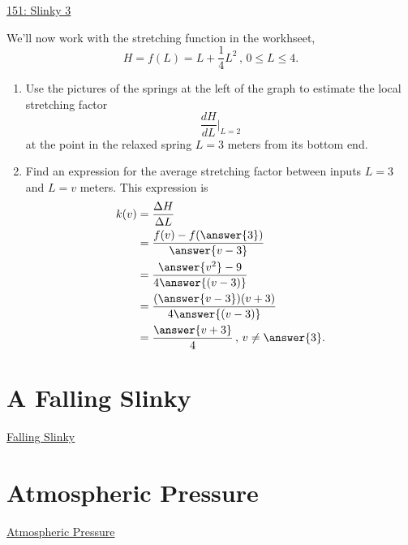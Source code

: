 \documentclass{ximera}
\begin{document}
\begin{example}
\begin{onlineOnly}
    \begin{center}
\end{center}
\end{onlineOnly}

\href{https://www.desmos.com/calculator/euapqewpoo}{151: Slinky 3}

We'll now work with the stretching function in the workhseet,
\[
      H = f(L) = L + \frac{1}{4}L^2 \, , \, 0\leq L \leq 4.
\]

\begin{enumerate}
\item Use the pictures of the springs at the left of the graph to estimate the local stretching factor
\[
  \frac{dH}{dL}\Big|_{L=2}
\]
at the point in the relaxed spring $L=3$ meters from its bottom end.

\item Find an expression for the average stretching factor between inputs $L=3$ and $L=v$ meters. This expression is
\begin{align*}
   k(v) &= \frac{\Delta H}{\Delta L} \\
              &= \frac{f(v) - f(\answer{3})}{\answer{v-3}} \\
              &=\frac{\answer{v^2}-9}{4\answer{(v-3)}}   \\
              &= \frac{(\answer{v-3})(v+3)}{4\answer{(v-3)}} \\
              &=   \frac{\answer{v+3}}{4} \, , \, v \neq \answer{3}.
\end{align*}
\end{enumerate}


\end{example}

\section{A Falling Slinky}

\href{https://www.youtube.com/watch?v=eCMmmEEyOO0}{Falling Slinky}


\section{Atmospheric Pressure}

\href{https://projects.iq.harvard.edu/files/acmg/files/intro_atmo_chem_bookchap2.pdf}{Atmospheric Pressure} 
\end{document}

